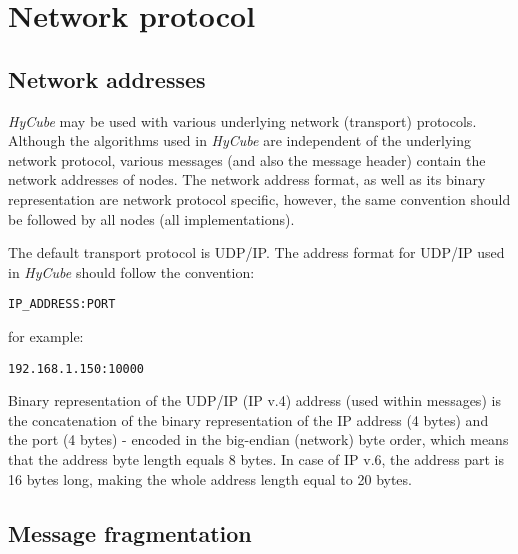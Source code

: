 \section{Network protocol}


\subsection{Network addresses}

\emph{HyCube} may be used with various underlying network (transport) protocols. Although the algorithms used in \emph{HyCube} are independent of the underlying network protocol, various messages (and also the message header) contain the network addresses of nodes. The network address format, as well as its binary representation are network protocol specific, however, the same convention should be followed by all nodes (all implementations).

The default transport protocol is UDP/IP. The address format for UDP/IP used in \emph{HyCube} should follow the convention:

\begin{lstlisting}[style=listing1noindent]
IP_ADDRESS:PORT
\end{lstlisting}

\noindent
for example:

\begin{lstlisting}[style=listing1noindent]
192.168.1.150:10000
\end{lstlisting}

\noindent
Binary representation of the UDP/IP (IP v.4) address (used within messages) is the concatenation of the binary representation of the IP address (4 bytes) and the port (4 bytes) - encoded in the big-endian (network) byte order, which means that the address byte length equals 8 bytes. In case of IP v.6, the address part is 16 bytes long, making the whole address length equal to 20 bytes.




\subsection{Message fragmentation}

